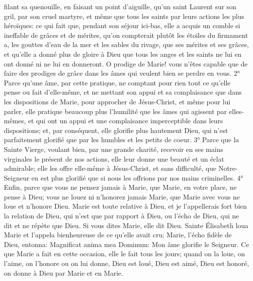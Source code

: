 filant sa quenouille, en faisant un point d'aiguille, qu'un saint Laurent sur son gril, par son cruel martyre, et même
que tous les saints par leurs actions les plus héroïques: ce qui fait que, pendant son séjour ici-bas, elle a acquis un
comble si ineffable de grâces et de mérites, qu'on compterait plutôt les étoiles du firmament a, les gouttes d'eau de
la mer et les sables du rivage, que ses mérites et ses grâces, et qu'elle a donné plus de gloire à Dieu que tous les
anges et les saints ne lui en ont donné ni ne lui en donneront. O prodige de Marie! vous n'êtes capable que de
faire des prodiges de grâce dans les âmes qui veulent bien se perdre en vous.
 2° Parce qu'une âme, par cette pratique, ne comptant pour rien tout ce qu'elle pense ou fait d'elle-même, et
ne mettant son appui et sa complaisance que dans les dispositions de Marie, pour approcher de Jésus-Christ, et
même pour lui parler, elle pratique beaucoup plus l'humilité que les âmes qui agissent par elles-mêmes, et qui ont
un appui et une complaisance imperceptible dans leurs dispositions; et, par conséquent, elle glorifie plus
hautement Dieu, qui n'est parfaitement glorifié que par les humbles et les petits de coeur.
 3° Parce que la Sainte Vierge, voulant bien, par une grande charité, recevoir en ses mains virginales le
présent de nos actions, elle leur donne une beauté et un éclat admirable; elle les offre elle-même à Jésus-Christ,
et sans difficulté, que Notre-Seigneur en est plus glorifié que si nous les offrions par nos mains criminelles.
 4° Enfin, parce que vous ne pensez jamais à Marie, que Marie, en votre place, ne pense à Dieu; vous ne
louez ni n'honorez jamais Marie, que Marie avec vous ne loue et n'honore Dieu. Marie est toute relative à Dieu, et
je l'appellerais fort bien la relation de Dieu, qui n'est que par rapport à Dieu, ou l'écho de Dieu, qui ne dit et ne
répète que Dieu. Si vous dites Marie, elle dit Dieu. Sainte Élisabeth loua Marie et l'appela bienheureuse de ce
qu'elle avait cru; Marie, l'écho fidèle de Dieu, entonna: Magnificat anima mea Dominum: Mon âme glorifie le
Seigneur. Ce que Marie a fait en cette occasion, elle le fait tous les jours; quand on la loue, on l'aime, on l'honore
ou on lui donne, Dieu est loué, Dieu est aimé, Dieu est honoré, on donne à Dieu par Marie et en Marie.
